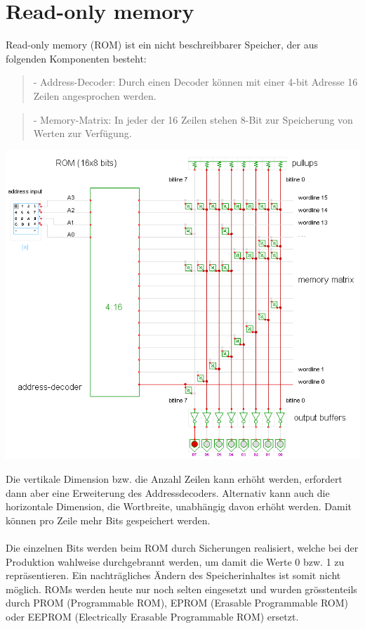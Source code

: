 \documentclass[a4paper,10pt]{report}
\begin{document}
\section{Read-only memory}
Read-only memory (ROM) ist ein nicht beschreibbarer Speicher, der aus folgenden Komponenten besteht:
\begin{quote}- Address-Decoder: Durch einen Decoder können mit einer 4-bit Adresse 16 Zeilen angesprochen werden. \end{quote}
\begin{quote}- Memory-Matrix: In jeder der 16 Zeilen stehen 8-Bit zur Speicherung von Werten zur Verfügung.\end{quote}
\begin{center}
\includegraphics[scale=0.85]{imgs/rom.png}
\end{center}
Die vertikale Dimension bzw. die Anzahl Zeilen kann erhöht werden, erfordert dann aber eine Erweiterung des Addressdecoders.
Alternativ kann auch die horizontale Dimension, die Wortbreite, unabhängig davon erhöht werden. Damit können pro Zeile mehr Bits gespeichert werden.
\\ \\
Die einzelnen Bits werden beim ROM durch Sicherungen realisiert, welche bei der Produktion wahlweise durchgebrannt werden, um damit die Werte 0 bzw. 1 zu repräsentieren. Ein nachträgliches Ändern des Speicherinhaltes ist somit nicht möglich. ROMs werden heute nur noch selten eingesetzt und wurden grösstenteils durch PROM (Programmable ROM), EPROM (Erasable Programmable ROM) oder EEPROM (Electrically Erasable Programmable ROM) ersetzt.
\end{document}
